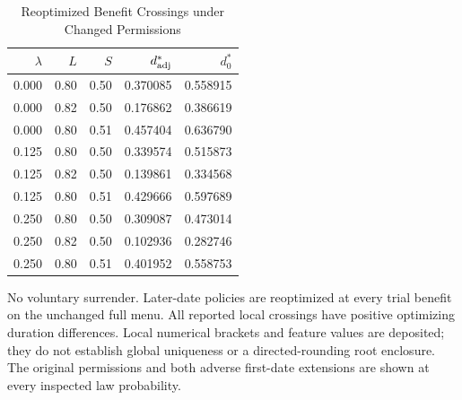\begin{table}[tbp]
\centering\small
\caption{Reoptimized Benefit Crossings under Changed Permissions}
\label{tab:r9_benefit_frontiers}
\begin{tabular}{rrrrr}
\toprule
$\lambda$ & $L$ & $S$ & $d^*_{\rm adj}$ & $d^*_0$ \\
\midrule
0.000 & 0.80 & 0.50 & 0.370085 & 0.558915 \\
0.000 & 0.82 & 0.50 & 0.176862 & 0.386619 \\
0.000 & 0.80 & 0.51 & 0.457404 & 0.636790 \\
0.125 & 0.80 & 0.50 & 0.339574 & 0.515873 \\
0.125 & 0.82 & 0.50 & 0.139861 & 0.334568 \\
0.125 & 0.80 & 0.51 & 0.429666 & 0.597689 \\
0.250 & 0.80 & 0.50 & 0.309087 & 0.473014 \\
0.250 & 0.82 & 0.50 & 0.102936 & 0.282746 \\
0.250 & 0.80 & 0.51 & 0.401952 & 0.558753 \\
\bottomrule
\end{tabular}
\begin{minipage}{0.98\textwidth}\footnotesize\medskip
No voluntary surrender. Later-date policies are reoptimized at every trial benefit on the unchanged full menu. All reported local crossings have positive optimizing duration differences. Local numerical brackets and feature values are deposited; they do not establish global uniqueness or a directed-rounding root enclosure. The original permissions and both adverse first-date extensions are shown at every inspected law probability.
\end{minipage}
\end{table}
